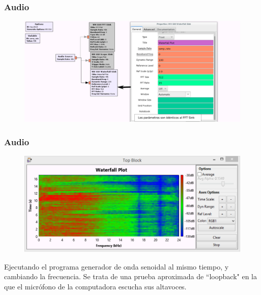 \begin{frame}[fragile]
\frametitle{Audio}
\justifying

\begin{figure}

\begin{center}
\includegraphics[width=\textwidth]{lab3/pdf/lab36.pdf}
\end{center}

\end{figure}

\end{frame}

\begin{frame}[fragile]
\frametitle{Audio}
\justifying

\begin{figure}

\begin{center}
\includegraphics[width=\textwidth]{lab3/pdf/lab37.pdf}

\end{center}

\end{figure}

\justifying
Ejecutando el programa generador de onda senoidal al mismo
tiempo, y cambiando la frecuencia. Se trata de una prueba
aproximada de “loopback" en la que el micrófono de la
computadora escucha sus altavoces.


\end{frame}

